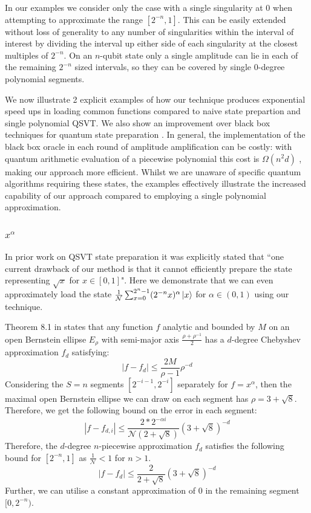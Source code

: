 \documentclass[aps,prx,twocolumn,floatfix,10pt,amssymb,amsfont,amsmath,superscriptaddress,float,nofootinbib,longbibliography,nobalancelastpage]{revtex4-2}
\theoremstyle{empty}
\begin{document}
In our examples we consider only the case with a single singularity at $0$ when attempting to approximate the range $[2^{-n},1]$. This can be easily extended without loss of generality to any number of singularities within the interval of interest by dividing the interval up either side of each singularity at the closest multiples of $2^{-n}$. On an $n$-qubit state only a single amplitude can lie in each of the remaining $2^{-n}$ sized intervals, so they can be covered by single 0-degree polynomial segments.

We now illustrate 2 explicit examples of how our technique produces exponential speed ups in loading common functions compared to naive state prepartion and single polynomial QSVT. We also show an improvement over black box techniques for quantum state preparation \cite{Sanders_2020, Bausch:2020wxy}. In general, the implementation of the black box oracle in each round of amplitude amplification can be costly: with quantum arithmetic evaluation of a piecewise polynomial this cost is $\Omega(n^2d)$ \cite{Haner:2018yea}, making our approach more efficient.
Whilst we are unaware of specific quantum algorithms requiring these states, the examples effectively illustrate the increased capability of our approach compared to employing a single polynomial approximation.


\subsubsection{$x^{\alpha}$}
\label{section:sqrt}
In prior work \cite{mcardleQuantumStatePreparation2022} on QSVT state preparation it was explicitly stated that ``one current drawback of our method is that it cannot efficiently prepare the state representing $\sqrt{x}$ for $x \in [0, 1]$".
Here we demonstrate that we can even approximately load the state $\frac{1}{\mathcal{N}} \sum_{x=0}^{2^n-1} (2^{-n}x)^{\alpha} \ket{x}$ for $\alpha \in (0,1)$ using our technique.

Theorem 8.1 in \cite{Trefethen} states that any function $f$ analytic and bounded by $M$ on an open Bernstein ellipse $E_{\rho}$ with semi-major axis $\frac{\rho+\rho^{-1}}{2}$ has a $d$-degree Chebyshev approximation $f_d$ satisfying:
\begin{equation}
    |f - f_d| \leq \frac{2M}{\rho - 1}\rho^{-d}
\end{equation}
Considering the $S=n$ segments $[2^{-i-1}, 2^{-i}]$ separately for $f=x^{\alpha}$, then the maximal open Bernstein ellipse we can draw on each segment has $\rho = 3+\sqrt{8}$. Therefore, we get the following bound on the error in each segment:
\begin{equation}
    |f - f_{d,i}| \leq \frac{2*2^{-\alpha i}}{\mathcal{N}(2+ \sqrt{8})} (3+\sqrt{8})^{-d}
\end{equation}
Therefore, the $d$-degree $n$-piecewise approximation $f_{d}$ satisfies the following bound for $[2^{-n}, 1]$ as $\frac{1}{\mathcal{N}} < 1$ for $n>1$.
\begin{equation}
    |f - f_{d}| \leq \frac{2}{2+ \sqrt{8}} (3+\sqrt{8})^{-d}
\end{equation}
Further, we can utilise a constant approximation of $0$ in the remaining segment $[0, 2^{-n})$. 
\end{document}
